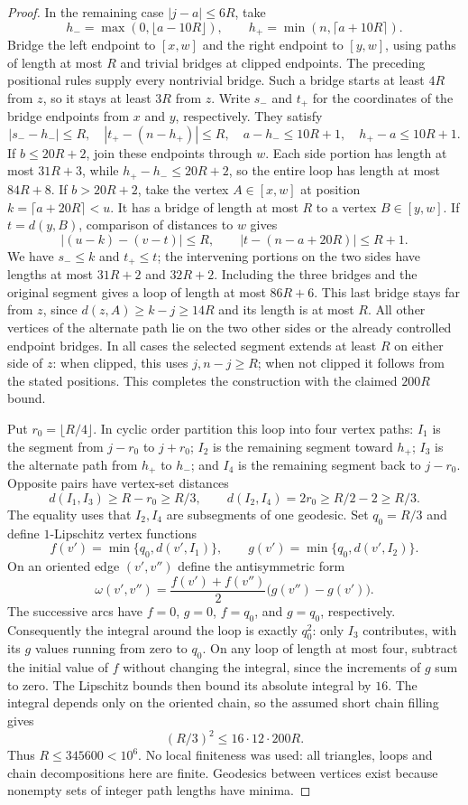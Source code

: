 \begin{proof}
In the remaining case $|j-a|\le6R$, take
\[
 h_- =\max(0,\lfloor a-10R\rfloor),\qquad
 h_+ =\min(n,\lceil a+10R\rceil).
\]
Bridge the left endpoint to $[x,w]$ and the right endpoint to $[y,w]$,
using paths of length at most $R$ and trivial bridges at clipped endpoints.
The preceding positional rules supply every nontrivial bridge.  Such a
bridge starts at least $4R$ from $z$, so it stays at least $3R$ from $z$.
Write $s_-$ and $t_+$ for the coordinates of the bridge endpoints from
$x$ and $y$, respectively.  They satisfy
\[
 |s_--h_-|\le R,\quad |t_+-(n-h_+)|\le R,\quad
 a-h_-\le10R+1,\quad h_+-a\le10R+1.
\]
If $b\le20R+2$, join these endpoints through $w$.  Each side portion
has length at most $31R+3$, while $h_+-h_-\le20R+2$, so the entire loop
has length at most $84R+8$.  If $b>20R+2$, take the vertex $A\in[x,w]$
at position $k=\lceil a+20R\rceil<u$.  It has a bridge of length at most
$R$ to a vertex $B\in[y,w]$.  If $t=d(y,B)$, comparison of distances to
$w$ gives
\[
 |(u-k)-(v-t)|\le R,\qquad
 |t-(n-a+20R)|\le R+1.
\]
We have $s_-\le k$ and $t_+\le t$; the intervening portions on the two
sides have lengths at most $31R+2$ and $32R+2$.  Including the three
bridges and the original segment gives a loop of length at most $86R+6$.
This last bridge stays far from $z$, since
$d(z,A)\ge k-j\ge14R$ and its length is at most $R$.
All other vertices of the alternate path lie on the two other sides or
the already controlled endpoint bridges.  In all cases the selected
segment extends at least $R$ on either side of $z$: when clipped, this
uses $j,n-j\ge R$; when not clipped it follows from the stated positions.
This completes the construction with the claimed $200R$ bound.

Put $r_0=\lfloor R/4\rfloor$.  In cyclic order partition this loop into
four vertex paths: $I_1$ is the segment from $j-r_0$ to $j+r_0$;
$I_2$ is the remaining segment toward $h_+$; $I_3$ is the alternate path
from $h_+$ to $h_-$; and $I_4$ is the remaining segment back to $j-r_0$.
Opposite pairs have vertex-set distances
\[
 d(I_1,I_3)\ge R-r_0\ge R/3,\qquad
 d(I_2,I_4)=2r_0\ge R/2-2\ge R/3.
\]
The equality uses that $I_2,I_4$ are subsegments of one geodesic.
Set $q_0=R/3$ and define $1$-Lipschitz vertex functions
\[
 f(v')=\min\{q_0,d(v',I_1)\},\qquad
 g(v')=\min\{q_0,d(v',I_2)\}.
\]
On an oriented edge $(v',v'')$ define the antisymmetric form
\[
 \omega(v',v'')=
 \frac{f(v')+f(v'')}{2}\bigl(g(v'')-g(v')\bigr).
\]
The successive arcs have $f=0$, $g=0$, $f=q_0$, and $g=q_0$,
respectively.  Consequently the integral around the loop is exactly
$q_0^2$: only $I_3$ contributes, with its $g$ values running from zero
to $q_0$.  On any loop of length at most four, subtract the initial value
of $f$ without changing the integral, since the increments of $g$ sum to
zero.  The Lipschitz bounds then bound its absolute integral by $16$.
The integral depends only on the oriented chain, so the assumed short
chain filling gives
\[
 (R/3)^2\le16\cdot12\cdot200R.
\]
Thus $R\le345600<10^6$.  No local finiteness was used: all triangles,
loops and chain decompositions here are finite.  Geodesics between vertices
exist because nonempty sets of integer path lengths have minima.
\end{proof}

